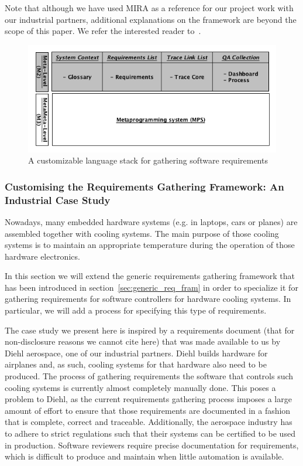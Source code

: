 Note that although we have used MIRA as a reference for our project work with
our industrial partners, additional explanations on the framework are beyond the
scope of this paper. We refer the interested reader to~\cite{MIRA13}.

\begin{figure}[!h]
\centering
\includegraphics[width=1\textwidth]{./figures/Fig1.png}
\caption{A customizable language stack for gathering software requirements}
\label{fig:meta_struct_reqs}
\end{figure}

\subsubsection{Customising the Requirements Gathering Framework: An Industrial
Case Study}
\label{sec:custom_frame}

Nowadays, many embedded hardware systems (e.g. in laptops, cars or
planes) are assembled together with cooling systems. The main purpose of
those cooling systems is to maintain an appropriate temperature during the
operation of those hardware electronics.

In this section we will extend the generic requirements gathering framework that
has been introduced in section~\ref{sec:generic_req_fram} in order to specialize it for
gathering requirements for software controllers for hardware cooling systems. In
particular, we will add a process for specifying this type of requirements. 

The case study we present here is inspired by a requirements document (that for
non-disclosure reasons we cannot cite here) that was made available to us by
Diehl aerospace, one of our industrial partners. Diehl builds hardware for
airplanes and, as such, cooling systems for that hardware also need to be
produced. The process of gathering requirements the software that controls such
cooling systems is currently almost completely manually done. This poses a
problem to Diehl, as the current requirements gathering process imposes a large
amount of effort to ensure that those requirements are documented in a fashion
that is complete, correct and traceable. Additionally, the aerospace industry
has to adhere to strict regulations such that their systems can be certified to
be used in production. Software reviewers require precise documentation for
requirements, which is difficult to produce and maintain when little automation
is available.

